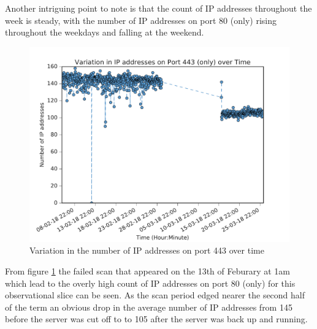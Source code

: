 \documentclass[a4wide,leqno,12pt]{report}
\begin{document}
Another intriguing  point to note is that the count of IP addresses throughout the week is steady, with the number of IP addresses on port 80 (only) rising throughout the weekdays and falling at the weekend.\\

\begin{figure}[H]
\centering
\includegraphics[scale=.5]{pdf_images/VariationInIpAddressesOnPort443OverTime}
\caption{Variation in the number of IP addresses on port 443 over time}
\label{fig:port443ZMap}
\end{figure}



From figure \ref{fig:port443ZMap} the failed scan that appeared on the 13th of Feburary at 1am which lead to the overly high count of IP addresses on port 80 (only) for this observational slice can be seen. As the scan period edged nearer the second half of the term an obvious drop in the average number of IP addresses from 145 before the server was cut off to to 105 after the server was back up and running.
\end{document}
